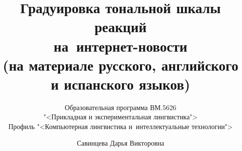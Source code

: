 \documentclass[xetex, aspectratio = 169]{beamer}
\begin{document}
\title{Градуировка тональной шкалы реакций \\ на~интернет-новости \\ (на материале русского, английского и испанского языков)}
\author{Савинцева Дарья Викторовна}
\subtitle{Образовательная программа ВМ.5626 \\ "<Прикладная и экспериментальная лингвистика"> \\ Профиль "<Компьютерная лингвистика и~интеллектуальные технологии">}
\date{}

\frame{\titlepage}



\end{document}
